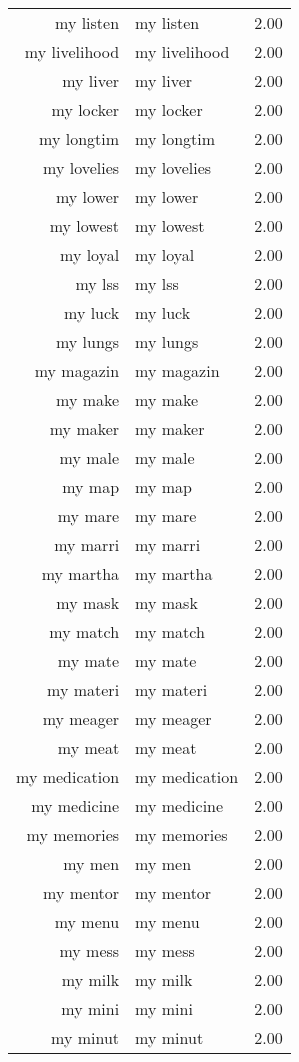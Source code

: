 \begin{table}[ht]
\begin{tabular}{rlr}
  my listen & my listen & 2.00 \\ 
  my livelihood & my livelihood & 2.00 \\ 
  my liver & my liver & 2.00 \\ 
  my locker & my locker & 2.00 \\ 
  my longtim & my longtim & 2.00 \\ 
  my lovelies & my lovelies & 2.00 \\ 
  my lower & my lower & 2.00 \\ 
  my lowest & my lowest & 2.00 \\ 
  my loyal & my loyal & 2.00 \\ 
  my lss & my lss & 2.00 \\ 
  my luck & my luck & 2.00 \\ 
  my lungs & my lungs & 2.00 \\ 
  my magazin & my magazin & 2.00 \\ 
  my make & my make & 2.00 \\ 
  my maker & my maker & 2.00 \\ 
  my male & my male & 2.00 \\ 
  my map & my map & 2.00 \\ 
  my mare & my mare & 2.00 \\ 
  my marri & my marri & 2.00 \\ 
  my martha & my martha & 2.00 \\ 
  my mask & my mask & 2.00 \\ 
  my match & my match & 2.00 \\ 
  my mate & my mate & 2.00 \\ 
  my materi & my materi & 2.00 \\ 
  my meager & my meager & 2.00 \\ 
  my meat & my meat & 2.00 \\ 
  my medication & my medication & 2.00 \\ 
  my medicine & my medicine & 2.00 \\ 
  my memories & my memories & 2.00 \\ 
  my men & my men & 2.00 \\ 
  my mentor & my mentor & 2.00 \\ 
  my menu & my menu & 2.00 \\ 
  my mess & my mess & 2.00 \\ 
  my milk & my milk & 2.00 \\ 
  my mini & my mini & 2.00 \\ 
  my minut & my minut & 2.00 \\ 

\end{tabular}
\end{table}
